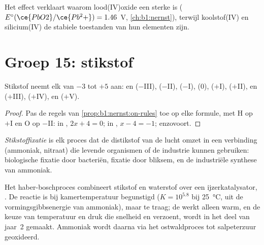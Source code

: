 Het effect verklaart waarom lood(IV)oxide een sterke  is
($E^\circ(\ce{PbO2}/\ce{Pb^2+}) = 1.46$~V, \cref{ch:b1:nernst}), terwijl
koolstof(IV) en silicium(IV) de stabiele toestanden van hun elementen
zijn.

\section{Groep 15: stikstof}

\begin{proposition}[De stikstofladder]\label{prop:b1:p-block-13-15:nitrogen-ladder}
Stikstof neemt elk  van $-3$ tot $+5$ aan:  en
 ($-$III),  ($-$II),  ($-$I),  (0),
 ($+$I),  ($+$II),  en  ($+$III),
 ($+$IV),  en  ($+$V).
\end{proposition}

\begin{proof}
Pas de regels van \cref{prop:b1:nernst:on-rules} toe op elke formule, met
H op $+$I en O op $-$II: in , $2x + 4 = 0$; in , $x - 4 =
-1$; enzovoort.
\end{proof}

\begin{definition}[Stikstoffixatie]\label{def:b1:p-block-13-15:nitrogen-fixation}
\emph{Stikstoffixatie} is elk proces dat de
distikstof van de lucht omzet in een verbinding (ammoniak, nitraat) die
levende organismen of de industrie kunnen gebruiken: biologische
fixatie door bacteriën, fixatie door bliksem, en de industriële synthese
van ammoniak.
\end{definition}

Het haber-boschproces combineert stikstof en waterstof over een
ijzerkatalysator, . De reactie is bij
kamertemperatuur begunstigd ($K = 10^{5.8}$ bij \qty{25}{\celsius}, uit de
vormingsgibbsenergie van ammoniak), maar te traag; de  werkt
alleen warm, en de keuze van temperatuur en druk die snelheid en
 verzoent, wordt in het deel van jaar~2 gemaakt. Ammoniak wordt
daarna via het ostwaldproces tot salpeterzuur geoxideerd.

